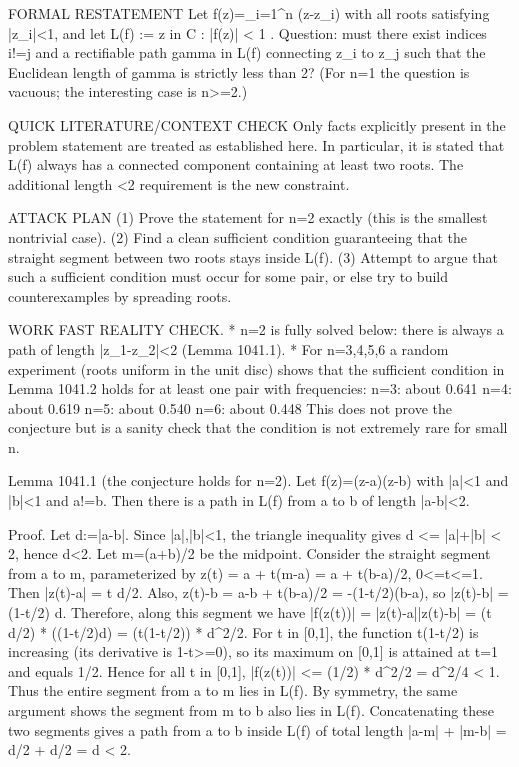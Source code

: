 FORMAL RESTATEMENT
Let f(z)=\prod_{i=1}^n (z-z_i) with all roots satisfying |z_i|<1, and let
  L(f) := { z in C : |f(z)| < 1 }.
Question: must there exist indices i!=j and a rectifiable path gamma in L(f) connecting z_i to z_j such that the Euclidean length of gamma is strictly less than 2?
(For n=1 the question is vacuous; the interesting case is n>=2.)

QUICK LITERATURE/CONTEXT CHECK
Only facts explicitly present in the problem statement are treated as established here. In particular, it is stated that L(f) always has a connected component containing at least two roots. The additional length <2 requirement is the new constraint.

ATTACK PLAN
(1) Prove the statement for n=2 exactly (this is the smallest nontrivial case).
(2) Find a clean sufficient condition guaranteeing that the straight segment between two roots stays inside L(f).
(3) Attempt to argue that such a sufficient condition must occur for some pair, or else try to build counterexamples by spreading roots.

WORK
FAST REALITY CHECK.
* n=2 is fully solved below: there is always a path of length |z_1-z_2|<2 (Lemma 1041.1).
* For n=3,4,5,6 a random experiment (roots uniform in the unit disc) shows that the sufficient condition in Lemma 1041.2 holds for at least one pair with frequencies:
  n=3: about 0.641
  n=4: about 0.619
  n=5: about 0.540
  n=6: about 0.448
This does not prove the conjecture but is a sanity check that the condition is not extremely rare for small n.

Lemma 1041.1 (the conjecture holds for n=2).
Let f(z)=(z-a)(z-b) with |a|<1 and |b|<1 and a!=b. Then there is a path in L(f) from a to b of length |a-b|<2.

Proof.
Let d:=|a-b|. Since |a|,|b|<1, the triangle inequality gives d <= |a|+|b| < 2, hence d<2.
Let m=(a+b)/2 be the midpoint.
Consider the straight segment from a to m, parameterized by
  z(t) = a + t(m-a) = a + t(b-a)/2,  0<=t<=1.
Then |z(t)-a| = t d/2.
Also,
  z(t)-b = a-b + t(b-a)/2 = -(1-t/2)(b-a),
so |z(t)-b| = (1-t/2) d.
Therefore, along this segment we have
  |f(z(t))| = |z(t)-a||z(t)-b| = (t d/2) * ((1-t/2)d) = (t(1-t/2)) * d^2/2.
For t in [0,1], the function t(1-t/2) is increasing (its derivative is 1-t>=0), so its maximum on [0,1] is attained at t=1 and equals 1/2.
Hence for all t in [0,1],
  |f(z(t))| <= (1/2) * d^2/2 = d^2/4 < 1.
Thus the entire segment from a to m lies in L(f).
By symmetry, the same argument shows the segment from m to b also lies in L(f).
Concatenating these two segments gives a path from a to b inside L(f) of total length
  |a-m| + |m-b| = d/2 + d/2 = d < 2.

